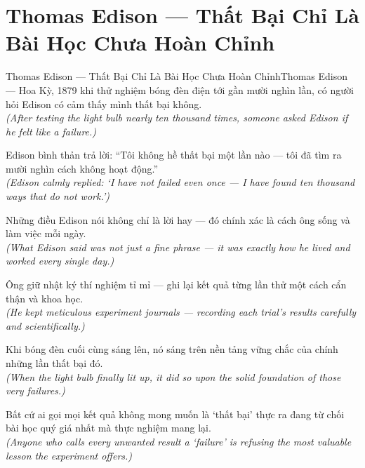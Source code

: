 \section{Thomas Edison --- Thất Bại Chỉ Là Bài Học Chưa Hoàn Chỉnh}
\begin{truyen}{Thomas Edison --- Thất Bại Chỉ Là Bài Học Chưa Hoàn Chỉnh}{Thomas Edison --- Hoa Kỳ, 1879}
 khi thử nghiệm bóng đèn điện tới gần mười nghìn lần, có người hỏi Edison có cảm thấy mình thất bại không.\\[4pt]
\textit{(After testing the light bulb nearly ten thousand times, someone asked Edison if he felt like a failure.)}

Edison bình thản trả lời: ``Tôi không hề thất bại một lần nào --- tôi đã tìm ra mười nghìn cách không hoạt động.''\\[4pt]
\textit{(Edison calmly replied: `I have not failed even once --- I have found ten thousand ways that do not work.')}

Những điều Edison nói không chỉ là lời hay --- đó chính xác là cách ông sống và làm việc mỗi ngày.\\[4pt]
\textit{(What Edison said was not just a fine phrase --- it was exactly how he lived and worked every single day.)}

Ông giữ nhật ký thí nghiệm tỉ mỉ --- ghi lại kết quả từng lần thử một cách cẩn thận và khoa học.\\[4pt]
\textit{(He kept meticulous experiment journals --- recording each trial's results carefully and scientifically.)}

Khi bóng đèn cuối cùng sáng lên, nó sáng trên nền tảng vững chắc của chính những lần thất bại đó.\\[4pt]
\textit{(When the light bulb finally lit up, it did so upon the solid foundation of those very failures.)}

\end{truyen}
\begin{baihoc}
  Bất cứ ai gọi mọi kết quả không mong muốn là `thất bại' thực ra đang từ chối bài học quý giá nhất mà thực nghiệm mang lại.\\[4pt]
  \textit{(Anyone who calls every unwanted result a `failure' is refusing the most valuable lesson the experiment offers.)}
\end{baihoc}

